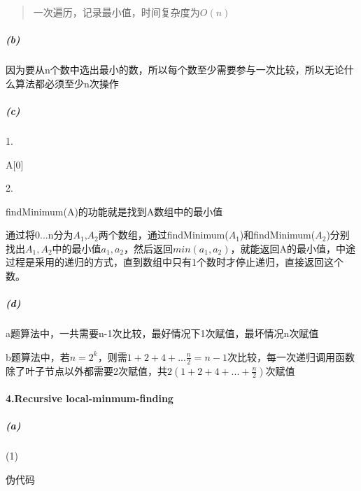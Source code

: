 \documentclass[
]{ctexart}
\begin{document}
\begin{quote}
一次遍历，记录最小值，时间复杂度为\(O(n)\)
\end{quote}

\hypertarget{header-n40}{%
\subparagraph{(b)}\label{header-n40}}

因为要从n个数中选出最小的数，所以每个数至少需要参与一次比较，所以无论什么算法都必须至少n次操作

\hypertarget{header-n42}{%
\subparagraph{(c)}\label{header-n42}}
 
{\qquad }

1.

A{[}0{]}

2.

findMinimum(A)的功能就是找到A数组中的最小值

通过将0...n分为\(A_1\),\(A_2\)两个数组，通过findMinimum(\(A_1\))和findMinimum(\(A_2\))分别找出\(A_1,A_2\)中的最小值\(a_1,a_2\)，然后返回\(min(a_1,a_2)\)，就能返回A的最小值，中途过程是采用的递归的方式，直到数组中只有1个数时才停止递归，直接返回这个数。

\hypertarget{header-n49}{%
\subparagraph{(d)}\label{header-n49}}

a题算法中，一共需要n-1次比较，最好情况下1次赋值，最坏情况n次赋值

b题算法中，若\(n=2^k\)，则需\(1+2+4+...\frac{n}{2}=n-1\)次比较，每一次递归调用函数除了叶子节点以外都需要2次赋值，共\(2(1+2+4+...+\frac{n}{2})\)次赋值

\hypertarget{header-n53}{%
\paragraph{4.Recursive local-minmum-finding}\label{header-n53}}

\hypertarget{header-n54}{%
\subparagraph{(a)}\label{header-n54}}

(1)

伪代码
\end{document}
